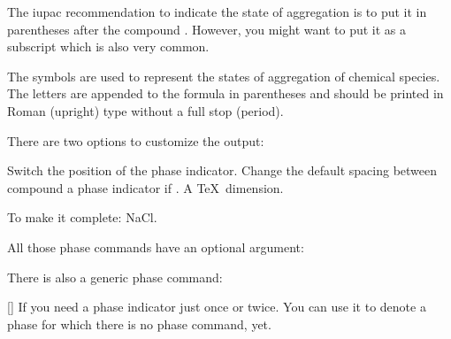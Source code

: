 \documentclass{chemmacros-manual}
\begin{document}
The \ac{iupac} recommendation to indicate the state of aggregation is to put
it in parentheses after the compound \cite{iupac:greenbook}.  However, you
might want to put it as a subscript which is also very common.

\begin{cnltxquote}
  The \textelp{} symbols are used to represent the states of aggregation of
  chemical species.  The letters are appended to the formula in parentheses
  and should be printed in Roman (upright) type without a full stop (period).
\end{cnltxquote}

There are two options to customize the output:
\begin{options}
    Switch the position of the phase indicator.
  \Initial{.1333em}
    Change the default spacing between compound a phase indicator if
    . A \TeX\ dimension.
\end{options}
\begin{example}
  \par
  To make it complete: NaCl\aq.
\end{example}

All those phase commands have an optional argument:
\begin{example}
\end{example}

There is also a generic phase command:
\begin{commands}
  []
    If you need a phase indicator just once or twice.  You can use it to
    denote a phase for which there is no phase command, yet.
\end{commands}
\end{document}
